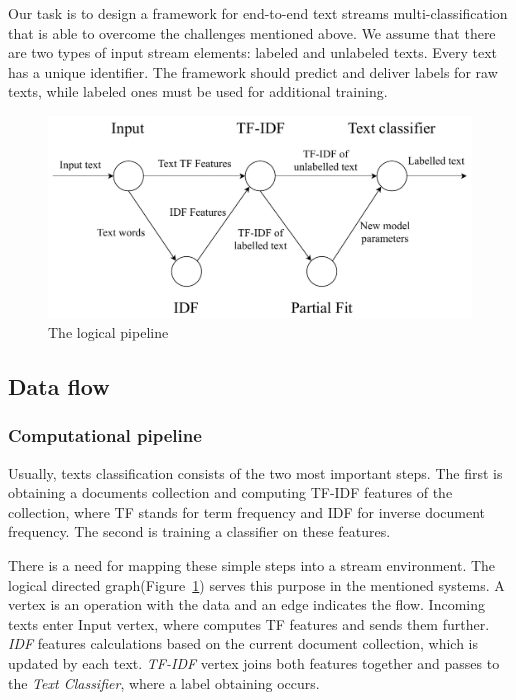 \label{fs-framework}

Our task is to design a framework for end-to-end text streams multi-classification that is able to overcome the challenges mentioned above. We assume that there are two types of input stream elements: labeled and unlabeled texts. Every text has a unique identifier. The framework should predict and deliver labels for raw texts, while labeled ones must be used for additional training.

\begin{figure}[htbp]
  \centering
  \includegraphics[scale=0.48]{pics/logical-graph}
  \caption{The logical pipeline}
  \label {logical_graph}
\end{figure}

\subsection{Data flow \label{DF}}

\subsubsection{Computational pipeline}

Usually, texts classification consists of the two most important steps. The first is obtaining a documents collection and computing TF-IDF features of the collection, where TF stands for term frequency and IDF for inverse document frequency. The second is training a classifier on these features.

There is a need for mapping these simple steps into a stream environment. The logical directed graph(Figure~\ref{logical_graph}) serves this purpose in the mentioned systems. A vertex is an operation with the data and an edge indicates the flow. Incoming texts enter Input vertex, where computes TF features and sends them further. {\em IDF} features calculations based on the current document collection, which is updated by each text. {\em TF-IDF} vertex joins both features together and passes to the {\em Text Classifier}, where a label obtaining occurs.

